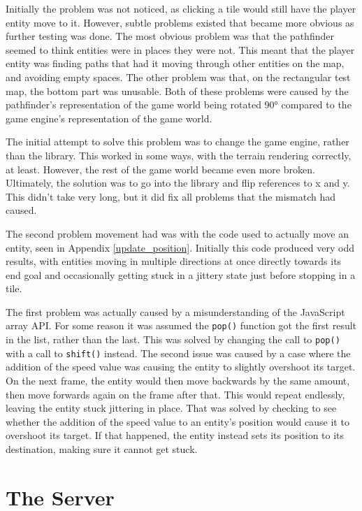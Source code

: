 Initially the problem was not noticed, as clicking a tile would still have the player entity move to it. However, subtle problems existed that became more obvious as further testing was done. The most obvious problem was that the pathfinder seemed to think entities were in places they were not. This meant that the player entity was finding paths that had it moving through other entities on the map, and avoiding empty spaces. The other problem was that, on the rectangular test map, the bottom part was unusable. Both of these problems were caused by the pathfinder's representation of the game world being rotated 90° compared to the game engine's representation of the game world.

The initial attempt to solve this problem was to change the game engine, rather than the library. This worked in some ways, with the terrain rendering correctly, at least. However, the rest of the game world became even more broken. Ultimately, the solution was to go into the library and flip references to x and y. This didn't take very long, but it did fix all problems that the mismatch had caused.

The second problem movement had was with the code used to actually move an entity, seen in Appendix \ref{update_position}. Initially this code produced very odd results, with entities moving in multiple directions at once directly towards its end goal and occasionally getting stuck in a jittery state just before stopping in a tile.

The first problem was actually caused by a misunderstanding of the JavaScript array API. For some reason it was assumed the \texttt{pop()} function got the first result in the list, rather than the last. This was solved by changing the call to \texttt{pop()} with a call to \texttt{shift()} instead. The second issue was caused by a case where the addition of the speed value was causing the entity to slightly overshoot its target. On the next frame, the entity would then move backwards by the same amount, then move forwards again on the frame after that. This would repeat endlessly, leaving the entity stuck jittering in place. That was solved by checking to see whether the addition of the speed value to an entity's position would cause it to overshoot its target. If that happened, the entity instead sets its position to its destination, making sure it cannot get stuck.

\section{The Server}\label{server_implementation}


